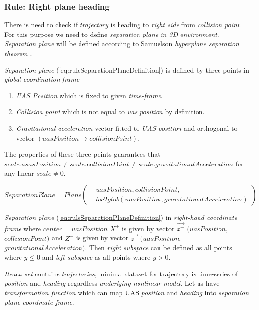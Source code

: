 \subsubsection{Rule: Right plane heading}
    \noindent There is need to check if \emph{trajectory} is heading to \emph{right side} from \emph{collision point}. For this purpose we need to define \emph{separation plane in 3D environment}. \emph{Separation plane} will be defined according to Samuelson \emph{hyperplane separation theorem} \cite{samelson1958partition}.
    
    \emph{Separation plane} (\ref{eq:ruleSeparationPlaneDefinition}) is defined by three points in \emph{global coordination frame}:
    \begin{enumerate}
        \item \emph{UAS Position} which is fixed to given \emph{time-frame}.
        \item \emph{Collision point} which is not equal to \emph{uas position} by definition.
        \item \emph{Gravitational acceleration} vector fitted to \emph{UAS position} and orthogonal to vector $(uasPosition\to collisionPoint)$.
    \end{enumerate}
    The properties of these three points guarantees that 
    $scale.usasPosition\neq scale.collisionPoint \neq scale.gravitationalAcceleration$ for any linear $scale\neq0$.
    
    \begin{equation}\label{eq:ruleSeparationPlaneDefinition}
        SeparationPlane=Plane\left(\begin{aligned}&uasPosition,collisionPoint,\\&loc2glob(uasPosition,gravitationalAcceleration)\end{aligned}\right)
    \end{equation}
    
    \noindent \emph{Separation plane} (\ref{eq:ruleSeparationPlaneDefinition}) in \emph{right-hand coordinate frame} where $center=uasPosition$ $X^+$ is given by vector $\vec{x^+}$ $(uasPosition,$ $collisionPoint)$  and $Z^-$ is given by vector $\vec{z^-}$  $(uasPosition,$ $gravitationalAcceleration)$. Then \emph{right subspace} can be defined as all points where $y\le0$ and \emph{left subspace} as all points where $y>0$.
    
    \emph{Reach set} contains \emph{trajectories}, minimal dataset for trajectory is time-series of \emph{position} and \emph{heading} regardless \emph{underlying nonlinear model}. Let us have \emph{transformation function} which can map UAS \emph{position} and \emph{heading} into \emph{separation plane coordinate frame}. 
    
